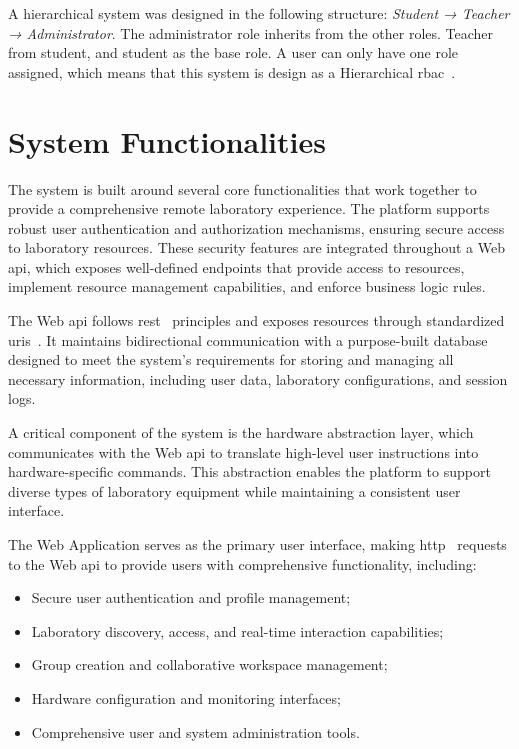 A hierarchical system was designed in the following structure: \textit{Student → Teacher → Administrator}. The administrator role inherits from the other roles. Teacher from student, and student as the base role. A user can only have one role assigned, which means that this system is design as a Hierarchical \acf{rbac}~\cite{rbac}.

\section{System Functionalities}\label{sec:system_functionalities}
The system is built around several core functionalities that work together to provide a comprehensive remote laboratory experience. The platform supports robust user authentication and authorization mechanisms, ensuring secure access to laboratory resources. These security features are integrated throughout a Web \acs{api}, which exposes well-defined endpoints that provide access to resources, implement resource management capabilities, and enforce business logic rules.

The Web \acs{api} follows \ac{rest}~\cite{rest} principles and exposes resources through standardized \acp{uri}~\cite{uri}. It maintains bidirectional communication with a purpose-built database designed to meet the system's requirements for storing and managing all necessary information, including user data, laboratory configurations, and session logs.

A critical component of the system is the hardware abstraction layer, which communicates with the Web \ac{api} to translate high-level user instructions into hardware-specific commands. This abstraction enables the platform to support diverse types of laboratory equipment while maintaining a consistent user interface.

The Web Application serves as the primary user interface, making \ac{http}~\cite{http} requests to the Web \ac{api} to provide users with comprehensive functionality, including:

\begin{itemize}
    \item Secure user authentication and profile management;
    \item Laboratory discovery, access, and real-time interaction capabilities;
    \item Group creation and collaborative workspace management;
    \item Hardware configuration and monitoring interfaces;
    \item Comprehensive user and system administration tools.
\end{itemize}

